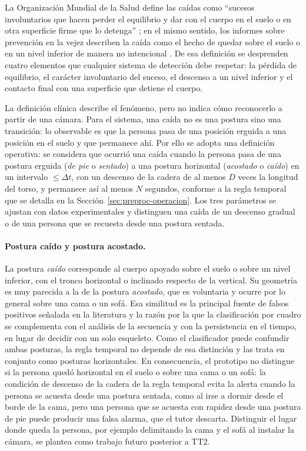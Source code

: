 \documentclass[12pt,a4paper,oneside]{book}
\theoremstyle{plain}
\theoremstyle{definition}
\theoremstyle{remark}
\begin{document}
La Organización Mundial de la Salud define las caídas como ``sucesos involuntarios que hacen perder el equilibrio y dar con el cuerpo en el suelo o en otra superficie firme que lo detenga'' \parencite{who2021caidas}; en el mismo sentido, los informes sobre prevención en la vejez describen la caída como el hecho de quedar sobre el suelo o en un nivel inferior de manera no intencional \parencite{who2008falls}. De esa definición se desprenden cuatro elementos que cualquier sistema de detección debe respetar: la pérdida de equilibrio, el carácter involuntario del suceso, el descenso a un nivel inferior y el contacto final con una superficie que detiene el cuerpo.

La definición clínica describe el fenómeno, pero no indica cómo reconocerlo a partir de una cámara. Para el sistema, una caída no es una postura sino una transición: lo observable es que la persona pasa de una posición erguida a una posición en el suelo y que permanece ahí. Por ello se adopta una definición operativa: se considera que ocurrió una caída cuando la persona pasa de una postura erguida (\textit{de pie} o \textit{sentado}) a una postura horizontal (\textit{acostado} o \textit{caído}) en un intervalo $\leq \Delta t$, con un descenso de la cadera de al menos $D$ veces la longitud del torso, y permanece así al menos $N$ segundos, conforme a la regla temporal que se detalla en la Sección~\ref{sec:preproc-operacion}. Los tres parámetros se ajustan con datos experimentales y distinguen una caída de un descenso gradual o de una persona que se recuesta desde una postura sentada.

\paragraph{Postura caído y postura acostado.} La postura \textit{caído} corresponde al cuerpo apoyado sobre el suelo o sobre un nivel inferior, con el tronco horizontal o inclinado respecto de la vertical. Su geometría es muy parecida a la de la postura \textit{acostado}, que es voluntaria y ocurre por lo general sobre una cama o un sofá. Esa similitud es la principal fuente de falsos positivos señalada en la literatura \parencite{nahian2026ai} y la razón por la que la clasificación por cuadro se complementa con el análisis de la secuencia y con la persistencia en el tiempo, en lugar de decidir con un solo esqueleto. Como el clasificador puede confundir ambas posturas, la regla temporal no depende de esa distinción y las trata en conjunto como posturas horizontales. En consecuencia, el prototipo no distingue si la persona quedó horizontal en el suelo o sobre una cama o un sofá: la condición de descenso de la cadera de la regla temporal evita la alerta cuando la persona se acuesta desde una postura sentada, como al irse a dormir desde el borde de la cama, pero una persona que se acuesta con rapidez desde una postura de pie puede producir una falsa alarma, que el tutor descarta. Distinguir el lugar donde queda la persona, por ejemplo delimitando la cama y el sofá al instalar la cámara, se plantea como trabajo futuro posterior a TT2.
\end{document}
